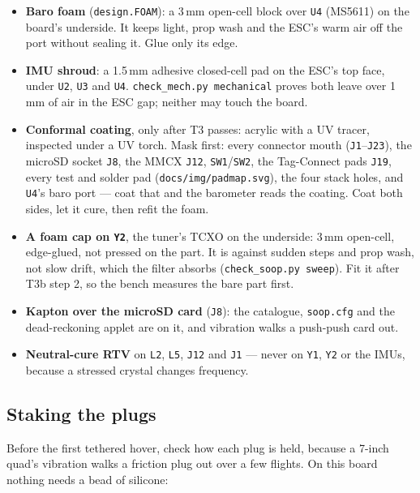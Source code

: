 \documentclass[11pt,a4paper]{article}
\newcommand{\file}[1]{\texttt{\small #1}}
\newcommand{\cmd}[1]{\texttt{\small #1}}
\begin{document}
\begin{itemize}
\item \textbf{Baro foam} (\file{design.FOAM}): a 3\,mm open-cell block over \file{U4}
(MS5611) on the board's underside. It keeps light, prop wash and the ESC's warm air off the
port without sealing it. Glue only its edge.
\item \textbf{IMU shroud}: a 1.5\,mm adhesive closed-cell pad on the ESC's top face, under
\file{U2}, \file{U3} and \file{U4}. \file{check\_mech.py mechanical} proves both leave over 1\,mm
of air in the ESC gap; neither may touch the board.
\item \textbf{Conformal coating}, only after T3 passes: acrylic with a UV tracer, inspected
under a UV torch. Mask first: every connector mouth (\file{J1}--\file{J23}), the microSD
socket \file{J8}, the MMCX \file{J12}, \file{SW1}/\file{SW2}, the Tag-Connect pads \file{J19},
every test and solder pad (\file{docs/img/padmap.svg}), the four stack holes, and \file{U4}'s
baro port --- coat that and the barometer reads the coating. Coat both sides, let it cure,
then refit the foam.
\item \textbf{A foam cap on \file{Y2}}, the tuner's TCXO on the underside: 3\,mm open-cell,
edge-glued, not pressed on the part. It is against sudden steps and prop wash, not slow drift,
which the filter absorbs (\cmd{check\_soop.py sweep}). Fit it after T3b step 2, so the bench
measures the bare part first.
\item \textbf{Kapton over the microSD card} (\file{J8}): the catalogue, \file{soop.cfg} and the
dead-reckoning applet are on it, and vibration walks a push-push card out.
\item \textbf{Neutral-cure RTV} on \file{L2}, \file{L5}, \file{J12} and \file{J1} --- never on
\file{Y1}, \file{Y2} or the IMUs, because a stressed crystal changes frequency.
\end{itemize}

\subsection{Staking the plugs}

Before the first tethered hover, check how each plug is held, because a 7-inch quad's
vibration walks a friction plug out over a few flights. On this board nothing needs a bead
of silicone:
\end{document}

